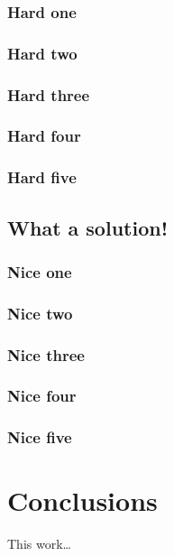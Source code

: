 \documentclass[%
        TwoSidePages,%
        English,%
        FinalVersion,%
        Copyright,%
        TablesPage,%
        FiguresPage,%
        ]%
{ic-tese-v2}
\begin{document}
\subsection{Hard one}

\subsection{Hard two}

\subsection{Hard three}

\subsection{Hard four}

\subsection{Hard five}

\section{What a solution!}

\subsection{Nice one}

\subsection{Nice two}

\subsection{Nice three}

\subsection{Nice four}

\subsection{Nice five}

\chapter{Conclusions} %
This work\ldots
\end{document}
